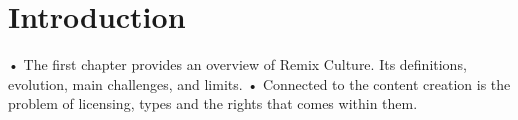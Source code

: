 \chapter*{Introduction}
\label{ch:introduction}


•	The first chapter provides an overview of Remix Culture. Its definitions, evolution, main challenges, and limits. 
•	Connected to the content creation is the problem of licensing, types and the rights that comes within them.
